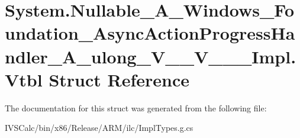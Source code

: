 \hypertarget{struct_system_1_1_nullable___a___windows___foundation___async_action_progress_handler___a__ulong___v_____v_______impl_1_1_vtbl}{}\section{System.\+Nullable\+\_\+\+A\+\_\+\+Windows\+\_\+\+Foundation\+\_\+\+Async\+Action\+Progress\+Handler\+\_\+\+A\+\_\+ulong\+\_\+\+V\+\_\+\+\_\+\+V\+\_\+\+\_\+\+\_\+\+Impl.\+Vtbl Struct Reference}
\label{struct_system_1_1_nullable___a___windows___foundation___async_action_progress_handler___a__ulong___v_____v_______impl_1_1_vtbl}


The documentation for this struct was generated from the following file\+:\begin{DoxyCompactItemize}
\item 
I\+V\+S\+Calc/bin/x86/\+Release/\+A\+R\+M/ilc/Impl\+Types.\+g.\+cs\end{DoxyCompactItemize}
